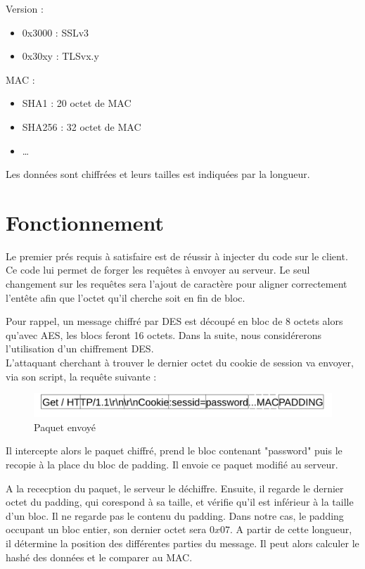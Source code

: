 Version :
\begin{itemize}
\item 0x3000 : SSLv3
\item 0x30xy : TLSvx.y
\end{itemize}

MAC :
\begin{itemize}
\item SHA1 : 20 octet de MAC
\item SHA256 : 32 octet de MAC
\item \dots
\end{itemize}
Les données sont chiffrées et leurs tailles est indiquées par
la longueur.

\section{Fonctionnement}
\label{sec:fct}

Le premier prés requis à satisfaire est de réussir à injecter du code sur le client. Ce code lui permet 
de forger les requêtes à envoyer au serveur. Le seul changement sur les requêtes sera l'ajout de caractère pour
aligner correctement l'entête afin que l'octet qu'il cherche soit en fin de bloc.

Pour rappel, un message chiffré par DES est découpé en bloc de 8 octets alors qu'avec AES, les blocs feront 16 octets. Dans la suite, nous considérerons l'utilisation d'un chiffrement DES.\\ 

L'attaquant cherchant à trouver le dernier octet du cookie de session va envoyer, via son script, la requête suivante :

\begin{figure}[h]
\label{fig:packet1}
\centering
\includegraphics[scale=0.5]{Packet1}
\caption{Paquet envoyé}
\end{figure}

Il intercepte alors le paquet chiffré, prend le bloc contenant "password" puis le recopie à la
place du bloc de padding. Il envoie ce paquet modifié au serveur. 

 A la rececption du paquet, le serveur le déchiffre. Ensuite, il regarde le dernier octet du padding, qui corespond
à sa taille, et vérifie qu'il est inférieur à la taille d'un bloc. Il ne regarde pas le contenu du padding.
Dans notre cas, le padding occupant un bloc entier, son dernier octet sera $0x07$. A partir de cette longueur, 
il détermine la position des différentes parties du message. Il peut alors calculer le hashé des données et le comparer au MAC.


